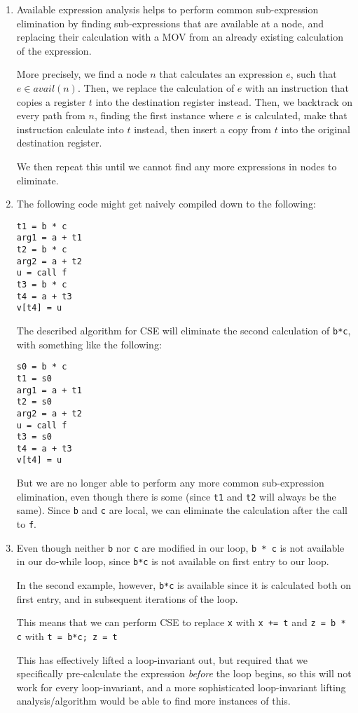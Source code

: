 \begin{enumerate}[label=(\alph*)]
\item
    Available expression analysis helps to perform common sub-expression elimination by finding sub-expressions that are available at a node, and replacing their calculation with a MOV from an already existing calculation of the expression.

    More precisely, we find a node $n$ that calculates an expression $e$, such that $e \in avail(n)$. Then, we replace the calculation of $e$ with an instruction that copies a register $t$ into the destination register instead. Then, we backtrack on every path from $n$, finding the first instance where $e$ is calculated, make that instruction calculate into $t$ instead, then insert a copy from $t$ into the original destination register.

    We then repeat this until we cannot find any more expressions in nodes to eliminate.

\item
    The following code might get naively compiled down to the following:

\begin{verbatim}
t1 = b * c
arg1 = a + t1
t2 = b * c
arg2 = a + t2
u = call f
t3 = b * c
t4 = a + t3
v[t4] = u
\end{verbatim}

The described algorithm for CSE will eliminate the second calculation of \texttt{b*c}, with something like the following:

\begin{verbatim}
s0 = b * c
t1 = s0
arg1 = a + t1
t2 = s0
arg2 = a + t2
u = call f
t3 = s0
t4 = a + t3
v[t4] = u
\end{verbatim}

But we are no longer able to perform any more common sub-expression elimination, even though there is some (since \texttt{t1} and \texttt{t2} will always be the same). Since \texttt{b} and \texttt{c} are local, we can eliminate the calculation after the call to \texttt{f}.

\item
    Even though neither \texttt{b} nor \texttt{c} are modified in our loop, \texttt{b * c} is not available in our do-while loop, since \texttt{b*c} is not available on first entry to our loop.

    In the second example, however, \texttt{b*c} is available since it is calculated both on first entry, and in subsequent iterations of the loop.

    This means that we can perform CSE to replace \texttt{x} with \texttt{x += t} and \texttt{z = b * c} with \texttt{t = b*c; z = t}

    This has effectively lifted a loop-invariant out, but required that we specifically pre-calculate the expression \textit{before} the loop begins, so this will not work for every loop-invariant, and a more sophisticated loop-invariant lifting analysis/algorithm would be able to find more instances of this.


        
    \end{enumerate}

